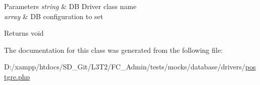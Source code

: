 \begin{DoxyParams}{Parameters}
{\em string} & D\+B Driver class name \\
\hline
{\em array} & D\+B configuration to set \\
\hline
\end{DoxyParams}
\begin{DoxyReturn}{Returns}
void 
\end{DoxyReturn}


The documentation for this class was generated from the following file\+:\begin{DoxyCompactItemize}
\item 
D\+:/xampp/htdocs/\+S\+D\+\_\+\+Git/\+L3\+T2/\+F\+C\+\_\+\+Admin/tests/mocks/database/drivers/\hyperlink{postgre_8php}{postgre.\+php}\end{DoxyCompactItemize}
